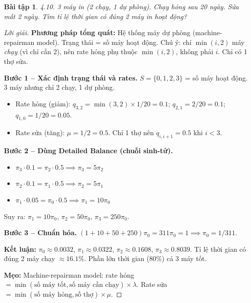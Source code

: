 \documentclass[8pt,a4paper]{article}
\newtheorem{exercise}{Bài tập}
\newenvironment{solution}{\begin{proof}[Lời giải]}{\end{proof}}
\begin{document}
\begin{exercise}
4.10. 3 máy in (2 chạy, 1 dự phòng). Chạy hỏng sau 20 ngày. Sửa mất 2 ngày. Tìm tỉ lệ thời gian có đúng 2 máy in hoạt động?
\end{exercise}
\begin{solution}
\textbf{Phương pháp tổng quát:} Hệ thống máy dự phòng (machine-repairman model). Trạng thái = số máy hoạt động. Chú ý: chỉ $\min(i, 2)$ máy \emph{chạy} (vì chỉ cần 2), nên rate hỏng phụ thuộc $\min(i, 2)$, không phải $i$. Chỉ có 1 thợ sửa.

\textbf{Bước 1 -- Xác định trạng thái và rates.} $S = \{0, 1, 2, 3\}$ = số máy hoạt động. 3 máy nhưng chỉ 2 chạy, 1 dự phòng.
\begin{itemize}[nosep]
\item Rate hỏng (giảm): $q_{3,2} = \min(3,2) \times 1/20 = 0.1$; $q_{2,1} = 2/20 = 0.1$; $q_{1,0} = 1/20 = 0.05$.
\item Rate sửa (tăng): $\mu = 1/2 = 0.5$. Chỉ 1 thợ nên $q_{i,i+1} = 0.5$ khi $i < 3$.
\end{itemize}

\textbf{Bước 2 -- Dùng Detailed Balance (chuỗi sinh-tử).}
\begin{itemize}[nosep]
\item $\pi_3 \cdot 0.1 = \pi_2 \cdot 0.5 \implies \pi_3 = 5\pi_2$
\item $\pi_2 \cdot 0.1 = \pi_1 \cdot 0.5 \implies \pi_2 = 5\pi_1$
\item $\pi_1 \cdot 0.05 = \pi_0 \cdot 0.5 \implies \pi_1 = 10\pi_0$
\end{itemize}
Suy ra: $\pi_1 = 10\pi_0$, $\pi_2 = 50\pi_0$, $\pi_3 = 250\pi_0$.

\textbf{Bước 3 -- Chuẩn hóa.} $(1 + 10 + 50 + 250)\pi_0 = 311\pi_0 = 1 \implies \pi_0 = 1/311$.

\textbf{Kết luận:} $\pi_0 \approx 0.0032$, $\pi_1 \approx 0.0322$, $\boxed{\pi_2 \approx 0.1608}$, $\pi_3 \approx 0.8039$. Tỉ lệ thời gian có đúng 2 máy chạy $\approx 16.1\%$. Phần lớn thời gian ($80\%$) cả 3 máy tốt.

\textbf{Mẹo:} Machine-repairman model: rate hỏng $= \min(\text{số máy tốt}, \text{số máy cần chạy}) \times \lambda$. Rate sửa $= \min(\text{số máy hỏng}, \text{số thợ}) \times \mu$.
\end{solution}

\end{document}

